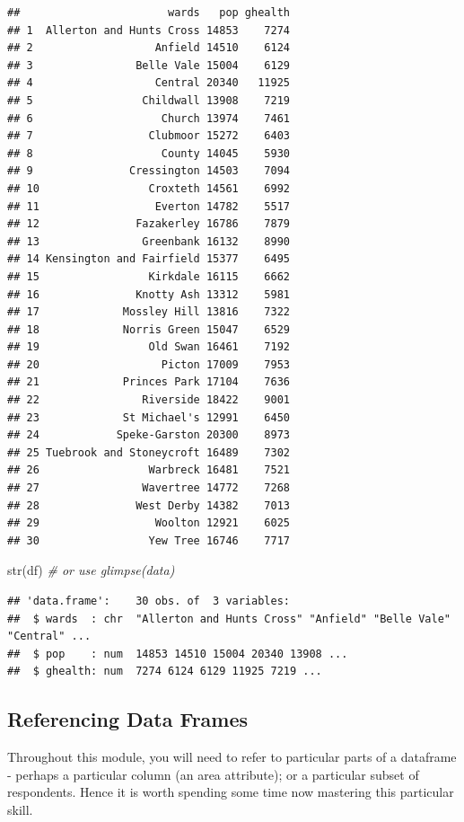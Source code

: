 \documentclass[
]{book}
\newenvironment{Shaded}{\begin{snugshade}}{\end{snugshade}}
\newcommand{\CommentTok}[1]{\textcolor[rgb]{0.56,0.35,0.01}{\textit{#1}}}
\newcommand{\FunctionTok}[1]{\textcolor[rgb]{0.00,0.00,0.00}{#1}}
\newcommand{\NormalTok}[1]{#1}
\begin{document}
\begin{verbatim}
##                       wards   pop ghealth
## 1  Allerton and Hunts Cross 14853    7274
## 2                   Anfield 14510    6124
## 3                Belle Vale 15004    6129
## 4                   Central 20340   11925
## 5                 Childwall 13908    7219
## 6                    Church 13974    7461
## 7                  Clubmoor 15272    6403
## 8                    County 14045    5930
## 9               Cressington 14503    7094
## 10                 Croxteth 14561    6992
## 11                  Everton 14782    5517
## 12               Fazakerley 16786    7879
## 13                Greenbank 16132    8990
## 14 Kensington and Fairfield 15377    6495
## 15                 Kirkdale 16115    6662
## 16               Knotty Ash 13312    5981
## 17             Mossley Hill 13816    7322
## 18             Norris Green 15047    6529
## 19                 Old Swan 16461    7192
## 20                   Picton 17009    7953
## 21             Princes Park 17104    7636
## 22                Riverside 18422    9001
## 23             St Michael's 12991    6450
## 24            Speke-Garston 20300    8973
## 25 Tuebrook and Stoneycroft 16489    7302
## 26                 Warbreck 16481    7521
## 27                Wavertree 14772    7268
## 28               West Derby 14382    7013
## 29                  Woolton 12921    6025
## 30                 Yew Tree 16746    7717
\end{verbatim}

\begin{Shaded}
\begin{Highlighting}[]
\FunctionTok{str}\NormalTok{(df) }\CommentTok{\# or use glimpse(data) }
\end{Highlighting}
\end{Shaded}

\begin{verbatim}
## 'data.frame':    30 obs. of  3 variables:
##  $ wards  : chr  "Allerton and Hunts Cross" "Anfield" "Belle Vale" "Central" ...
##  $ pop    : num  14853 14510 15004 20340 13908 ...
##  $ ghealth: num  7274 6124 6129 11925 7219 ...
\end{verbatim}

\hypertarget{referencing-data-frames}{%
\subsection{Referencing Data Frames}\label{referencing-data-frames}}

Throughout this module, you will need to refer to particular parts of a dataframe - perhaps a particular column (an area attribute); or a particular subset of respondents. Hence it is worth spending some time now mastering this particular skill.
\end{document}

